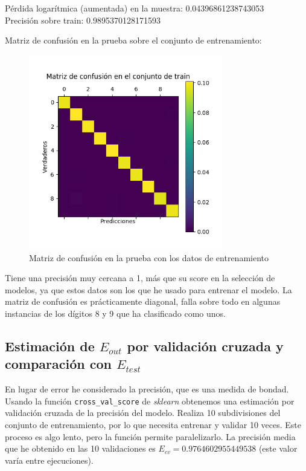 \documentclass[a4]{article}
\begin{document}
Pérdida logarítmica (aumentada) en la muestra: 0.04396861238743053 \\
Precisión sobre train: 0.9895370128171593

Matriz de confusión en la prueba sobre el conjunto de entrenamiento:
\vspace{-4mm}
\begin{figure}[H]
  \centering
  \includegraphics[width=85mm]{imgs/conf-train.png}
  \caption{Matriz de confusión en la prueba con los datos de
    entrenamiento}
  \label{fig:conf-train}
\end{figure}
\vspace{-4mm}

Tiene una precisión muy cercana a 1, más que su score en la selección
de modelos, ya que estos datos son los que he usado para entrenar el
modelo. La matriz de confusión es prácticamente diagonal, falla sobre
todo en algunas instancias de los dígitos 8 y 9 que ha clasificado
como unos.

\subsection{Estimación de $E_{out}$ por validación cruzada y
  comparación con $E_{test}$}

En lugar de error he considerado la precisión, que es una medida de
bondad. Usando la función \texttt{cross\_val\_score} de
\textit{sklearn} obtenemos una estimación por validación cruzada de la
precisión del modelo. Realiza 10 subdivisiones del conjunto de
entrenamiento, por lo que necesita entrenar y validar 10 veces. Este
proceso es algo lento, pero la función permite paralelizarlo. La
precisión media que he obtenido en las 10 validaciones es
$E_{cv} = 0.9764602955449538$ (este valor varía entre ejecuciones).
\end{document}
